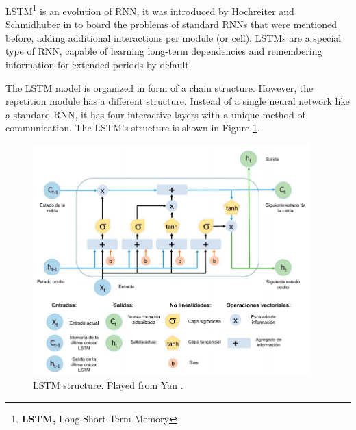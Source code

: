 LSTM\footnote{\textbf{LSTM,} Long Short-Term Memory} is an evolution of RNN, it was introduced by Hochreiter and Schmidhuber in \citeyear{Reference52} to board the problems of standard RNNs that were mentioned before, adding additional interactions per module (or cell). LSTMs are a special type of RNN, capable of learning long-term dependencies and remembering information for extended periods by default.

\vspace{5mm} %

The LSTM model is organized in form of a chain structure. However, the repetition module has a different structure. Instead of a single neural network like a standard RNN, it has four interactive layers with a unique method of communication. The LSTM's structure is shown in Figure \ref{fig:lstm}.

\begin{figure}[h!]
  \begin{center}	\includegraphics[width=0.95\textwidth, frame]{imagenes/Cap4/lstm}
  \caption{LSTM structure. Played from Yan \protect\cite{Reference54}.} 
  \label{fig:lstm}
  \end{center}
\end{figure}

